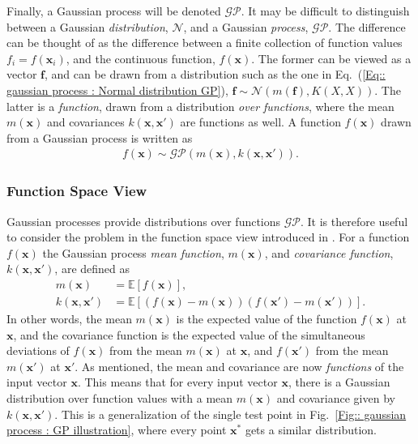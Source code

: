 \documentclass[twoside,english]{uiofysmaster}
\begin{document}
{Finally, a Gaussian process will be denoted $\mathcal{GP}$. It may be difficult to distinguish between a Gaussian \textit{distribution}, $\mathcal{N}$, and a Gaussian \textit{process}, $\mathcal{GP}$. The difference can be thought of as the difference between a finite collection of function values $f_i = f(\textbf{x}_i)$, and the continuous function, $f(\textbf{x})$. The former can be viewed as a vector $\textbf{f}$, and can be drawn from a distribution such as the one in Eq.~(\ref{Eq:: gaussian process : Normal distribution GP}), $\textbf{f} \sim \mathcal{N}(m(\textbf{f} ), K(X, X))$. The latter is a \textit{function}, drawn from a distribution \textit{over functions}, where the mean $m(\textbf{x})$ and covariances $k(\textbf{x}, \textbf{x}')$ are functions as well. A function $f(\textbf{x})$ drawn from a Gaussian process is written as 
\begin{align}
f(\textbf{x}) \sim \mathcal{GP} (m(\textbf{x}), k(\textbf{x}, \textbf{x}')).
\end{align}

\subsubsection{Function Space View}

Gaussian processes provide distributions over functions $\mathcal{GP}$. It is therefore useful to consider the problem in the function space view introduced in \cite{rasmussen2006gaussian}. For a function $f(\textbf{x})$ the Gaussian process \textit{mean function}, $m(\textbf{x})$, and \textit{covariance function}, $k(\textbf{x}, \textbf{x}')$, are defined as
\begin{align}
m(\textbf{x}) &= \mathbb{E}[f(\textbf{x})],\\
k(\textbf{x}, \textbf{x}') &= \mathbb{E} [(f(\textbf{x}) - m(\textbf{x}))(f(\textbf{x}') - m(\textbf{x}'))].
\end{align}
In other words, the mean $m(\textbf{x})$ is the expected value of the function $f(\textbf{x})$ at $\textbf{x}$, and the covariance function is the expected value of the simultaneous deviations of $f(\textbf{x})$ from the mean $m(\textbf{x})$ at $\textbf{x}$, and $f(\textbf{x}')$ from the mean $m(\textbf{x}')$ at $\textbf{x}'$. As mentioned, the mean and covariance are now \textit{functions} of the input vector $\textbf{x}$. This means that for every input vector $\textbf{x}$, there is a Gaussian distribution over function values with a mean $m(\textbf{x})$ and covariance given by $k(\textbf{x}, \textbf{x}')$. This is a generalization of the single test point in Fig.~\ref{Fig:: gaussian process : GP illustration}, where every point $\textbf{x}^*$ gets a similar distribution.

}
\end{document}
